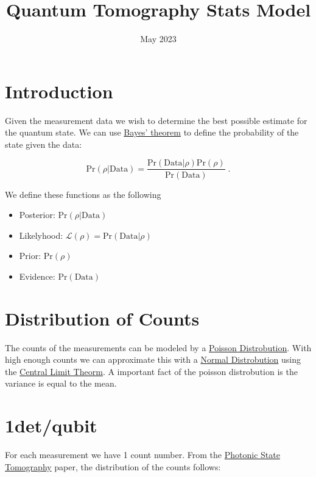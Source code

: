 \documentclass{article}
\title{Quantum Tomography Stats Model}
\date{May 2023}
\begin{document}
\maketitle

\newcommand{\Like}{\mathcal{L}}
\newcommand{\EX}{\mathbb{E}}
\newcommand{\Tr}[1]{\operatorname{Tr}\left(#1\right)}

\section{Introduction}
Given the measurement data we wish to determine the best possible estimate for the quantum state. We can use \href{https://en.wikipedia.org/wiki/Bayes%27_theorem}{Bayes' theorem} to define the probability of the state given the data:

$$\text{Pr}(\rho|\text{Data}) = \frac{\text{Pr}(\text{Data}|\rho)\text{Pr}(\rho)}{\text{Pr}(\text{Data})} \;.$$

We define these functions as the following
\begin{itemize}
\item Posterior:  $\text{Pr}(\rho|\text{Data})$
\item Likelyhood: $\Like(\rho) = \text{Pr}(\text{Data}|\rho)$
\item Prior:      $\text{Pr}(\rho)$
\item Evidence:   $\text{Pr}(\text{Data})$
\end{itemize}

\section{Distribution of Counts}
The counts of the measurements can be modeled by a \href{https://en.wikipedia.org/wiki/Poisson_distribution}{Poisson Distrobution}. With high enough counts we can approximate this with a \href{https://en.wikipedia.org/wiki/Normal_distribution}{Normal Distrobution} using the \href{https://en.wikipedia.org/wiki/Central_limit_theorem}{Central Limit Theorm}. A important fact of the poisson distrobution is the variance is equal to the mean.

\section{1det/qubit}
For each measurement we have 1 count number. From the \href{http://research.physics.illinois.edu/QI/Photonics/tomography-files/amo_tomo_chapter.pdf}{Photonic State Tomography} paper, the distribution of the counts follows:
\end{document}
